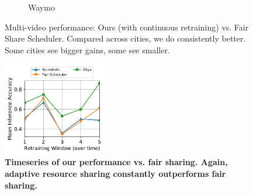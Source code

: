 \begin{figure}
\begin{subfigure}[t]{0.5\linewidth}
     \caption{\small Waymo}
    \label{fig:multicam-cities-waymo}
  \end{subfigure}
  \caption{Multi-video performance: Ours (with continuous retraining) vs. Fair Share Scheduler. Compared across cities, we do consistently better. Some cities see bigger gains, some see smaller.}
  \label{fig:multicam-cities}
\end{figure}


\begin{figure}
	\includegraphics[width=0.4\textwidth]{results/multicam/multicam_taskwise_acc_zurich_4_cityscapes.pdf}
	\caption{\small \bf Timeseries of our performance vs. fair sharing. Again, adaptive resource sharing constantly outperforms fair sharing. }
	\label{fig:multicam-timeseries}
\end{figure}


